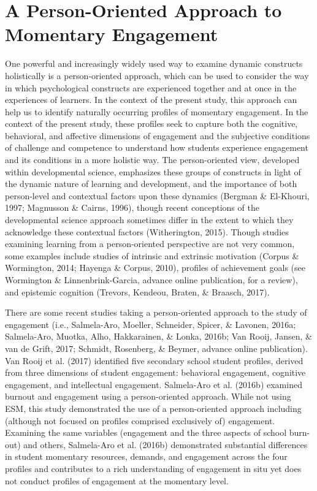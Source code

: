 \documentclass[]{msu-thesis}
\theoremstyle{definition}
\theoremstyle{definition}
\theoremstyle{definition}
\theoremstyle{remark}
\begin{document}
\section{A Person-Oriented Approach to Momentary
Engagement}\label{a-person-oriented-approach-to-momentary-engagement}

One powerful and increasingly widely used way to examine dynamic
constructs holistically is a person-oriented approach, which can be used
to consider the way in which psychological constructs are experienced
together and at once in the experiences of learners. In the context of
the present study, this approach can help us to identify naturally
occurring profiles of momentary engagement. In the context of the
present study, these profiles seek to capture both the cognitive,
behavioral, and affective dimensions of engagement and the subjective
conditions of challenge and competence to understand how students
experience engagement and its conditions in a more holistic way. The
person-oriented view, developed within developmental science, emphasizes
these groups of constructs in light of the dynamic nature of learning
and development, and the importance of both person-level and contextual
factors upon these dynamics (Bergman \& El-Khouri, 1997; Magnusson \&
Cairns, 1996), though recent conceptions of the developmental science
approach sometimes differ in the extent to which they acknowledge these
contextual factors (Witherington, 2015). Though studies examining
learning from a person-oriented perspective are not very common, some
examples include studies of intrinsic and extrinsic motivation (Corpus
\& Wormington, 2014; Hayenga \& Corpus, 2010), profiles of achievement
goals (see Wormington \& Linnenbrink-Garcia, advance online publication,
for a review), and epistemic cognition (Trevors, Kendeou, Braten, \&
Braasch, 2017).

There are some recent studies taking a person-oriented approach to the
study of engagement (i.e., Salmela-Aro, Moeller, Schneider, Spicer, \&
Lavonen, 2016a; Salmela-Aro, Muotka, Alho, Hakkarainen, \& Lonka, 2016b;
Van Rooij, Jansen, \& van de Grift, 2017; Schmidt, Rosenberg, \& Beymer,
advance online publication). Van Rooij et al. (2017) identified five
secondary school student profiles, derived from three dimensions of
student engagement: behavioral engagement, cognitive engagement, and
intellectual engagement. Salmela-Aro et al. (2016b) examined burnout and
engagement using a person-oriented approach. While not using ESM, this
study demonstrated the use of a person-oriented approach including
(although not focused on profiles comprised exclusively of) engagement.
Examining the same variables (engagement and the three aspects of school
burn-out) and others, Salmela-Aro et al. (2016b) demonstrated
substantial differences in student momentary resources, demands, and
engagement across the four profiles and contributes to a rich
understanding of engagement in situ yet does not conduct profiles of
engagement at the momentary level.
\end{document}
